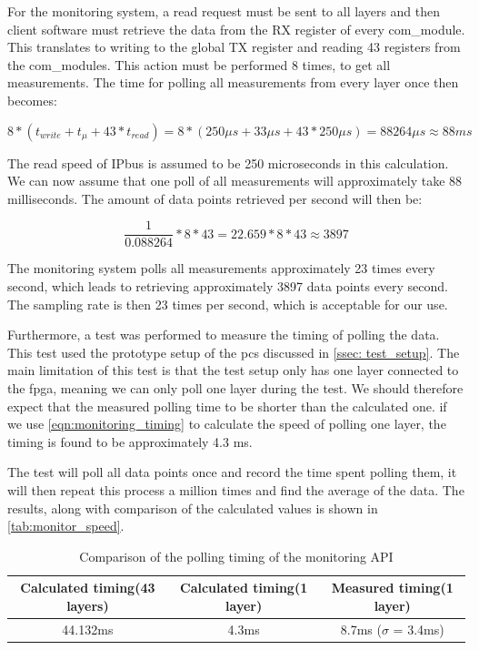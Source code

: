 \documentclass[main.tex]{subfiles}
\begin{document}
 For the monitoring system, a read request must be sent to all layers and then client software must retrieve the data from the RX register of every com\_module. This translates to writing to the global TX register and reading 43 registers from the com\_modules. This action must be performed 8 times, to get all measurements. The time for polling all measurements from every layer once then becomes:

\begin{equation} \label{eqn:monitoring_timing}
8*(t_{write}+t_{\mu } + 43*t_{read}) = 8*(250\mu s + 33 \mu s + 43*250\mu s) = 88264 \mu s \approx 88 ms
\end{equation}

The read speed of IPbus is assumed to be 250 microseconds in this calculation. We can now assume that one poll of all measurements will approximately take 88 milliseconds. The amount of data points retrieved per second will then be:

\begin{equation} \label{eqn:data_points_per_second}
\frac{1}{0.088264}*8*43 =  22.659 * 8*43 \approx 3897
\end{equation}

The monitoring system polls all measurements approximately 23 times every second, which leads to retrieving approximately 3897 data points every second. The sampling rate is then 23 times per second, which is acceptable for our use.

Furthermore, a test was performed to measure the timing of polling the data. This test used the prototype setup of the \gls{pcs} discussed in \autoref{ssec: test_setup}. The main limitation of this test is that the test setup only has one layer connected to the \gls{fpga}, meaning we can only poll one layer during the test. We should therefore expect that the measured polling time to be shorter than the calculated one. if we use \autoref{eqn:monitoring_timing} to calculate the speed of polling one layer, the timing is found to be approximately 4.3 ms.

The test will poll all data points once and record the time spent polling them, it will then repeat this process a million times and find the average of the data. The results, along with comparison of the calculated values is shown in \autoref{tab:monitor_speed}.

\begin{table}[h]
\centering
\begin{tabular}{||c c c||} 
 \hline
  Calculated timing(43 layers) & Calculated timing(1 layer) & Measured timing(1 layer) \\ [0.5ex] 
 \hline\hline
    44.132ms & 4.3ms & 8.7ms ($\sigma$ = 3.4ms) \\  [1ex] 
 \hline
\end{tabular}
\caption{\label{tab:monitor_speed} Comparison of the polling timing of the monitoring API}
\end{table}
\FloatBarrier
\end{document}
